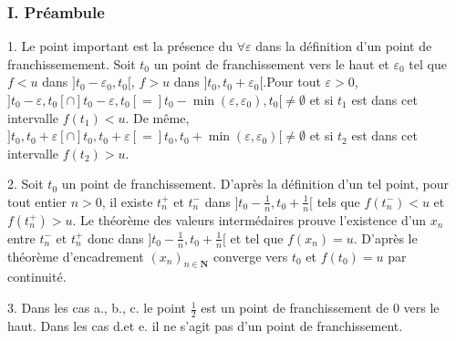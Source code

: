 \subsubsection*{I. Pr{\'e}ambule}

1.  Le point important est la pr{\'e}sence du $\forall \varepsilon
$ dans la d{\'e}finition d'un point de franchissemement. Soit
$t_{0}$ un point de franchissement vers le haut et $\varepsilon
_{0}$ tel que $f<u$ dans $] t_{0}-\varepsilon _{0},t_{0}[ $, $f>u$
dans $] t_{0},t_{0}+\varepsilon _{0}[ $.\newline Pour tout
$\varepsilon >0$, $] t_{0}-\varepsilon ,t_{0}[ \cap ]
t_{0}-\varepsilon ,t_{0}[ =] t_{0}-\min (\varepsilon ,\varepsilon
_{0}),t_{0}[ \neq \emptyset $ et si $t_{1}$ est dans cet
intervalle $f(t_{1})<u$. De m{\^e}me, $] t_{0},t_{0}+\varepsilon [
\cap ] t_{0},t_{0}+\varepsilon [ =] t_{0},t_{0}+\min (\varepsilon
,\varepsilon _{0})[ \neq \emptyset $ et si $t_{2}$ est dans cet
intervalle $f(t_{2})>u$.

2.  Soit $t_{0}$ un point de franchissement. D'apr{\`e}s la
d{\'e}finition d'un tel point, pour tout entier $n>0$, il existe
$t_{n}^{+}$ et $t_{n}^{-}$ dans $]
t_{0}-\frac{1}{n},t_{0}+\frac{1}{n}[ $ tels que $f(t_{n}^{-})<u$
et $f(t_{n}^{+})>u$. Le th{\'e}or{\`e}me des valeurs
interm{\'e}daires prouve l'existence d'un $x_{n}$ entre
$t_{n}^{-}$ et $t_{n}^{+}$ donc dans $]
t_{0}-\frac{1}{n},t_{0}+\frac{1}{n}[ $
et tel que $f(x_{n})=u$. D'apr{\`e}s le th{\'e}or{\`e}me d'encadrement $%
(x_{n})_{n\in \mathbf{N}}$ converge vers $t_{0}$ et $f(t_{0})=u$
par continuit{\'e}.

3.  Dans les cas a., b., c. le point $\frac{1}{2}$ est un point de
franchissement de $0$ vers le haut. Dans les cas d.et e. il ne
s'agit pas d'un point de franchissement.

